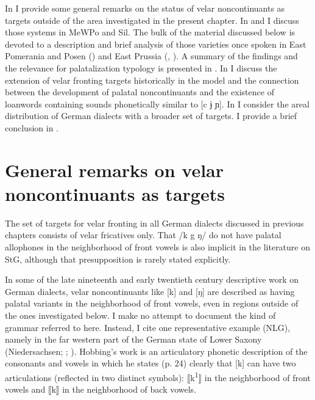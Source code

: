In  I provide some general remarks on the status of velar noncontinuants as targets outside of the area investigated in the present chapter. In  and  I discuss those systems in MeWPo and Sil. The bulk of the material discussed below is devoted to a description and brief analysis of those varieties once spoken in East Pomerania and Posen () and East Prussia (, ). A summary of the findings and the relevance for palatalization typology is presented in . In  I discuss the extension of velar fronting targets historically in the  model and the connection between the development of palatal noncontinuants and the existence of  loanwords containing sounds phonetically similar to [c ɉ ɲ]. In  I consider the areal distribution of German dialects with a broader set of targets. I provide a brief conclusion in .

\section{{General} {remarks} {on} {velar} {noncontinuants} {as} {targets}}\label{sec:11.2}

The set of targets for velar fronting in all German dialects discussed in previous chapters consists of velar fricatives only. That /k g ŋ/ do not have palatal allophones in the neighborhood of front vowels is also implicit in the literature on StG, although that presupposition is rarely stated explicitly.

In some of the late nineteenth and early twentieth century descriptive work on German dialects, velar noncontinuants like [k] and [ŋ] are described as having palatal variants in the neighborhood of front vowels, even in regions outside of the ones investigated below. I make no attempt to document the kind of grammar referred to here. Instead, I cite one representative example (NLG), namely  in the far western part of the German state of Lower Saxony (Niedersachsen; \citealt{Hobbing1879}; ). Hobbing’s work is an articulatory phonetic description of the consonants and vowels in which he states (p. 24) clearly that [k] can have two articulations (reflected in two distinct symbols): ⟦k\textsuperscript{1}⟧ in the neighborhood of front vowels and ⟦k⟧ in the neighborhood of back vowels.

